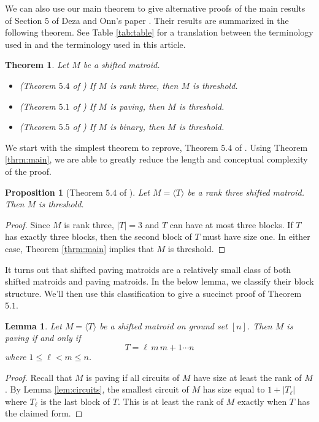 \documentclass{amsart}
\theoremstyle{definition}
\theoremstyle{plain}
\newtheorem{lemma}[defn]{Lemma}
\newtheorem{prop}[defn]{Proposition}
\newtheorem{thrm}[defn]{Theorem}
\begin{document}
We can also use our main theorem to give alternative proofs of the main results of Section $5$ of Deza and Onn's paper \cite{DO}. Their results are summarized in the following theorem. See Table \ref{tab:table} for a translation between the terminology used in \cite{DO} and the terminology used in this article. 

\begin{thrm}
\label{thrm:DO}
Let $M$ be a shifted matroid.
\begin{itemize}
\item (Theorem $5.4$ of \cite{DO}) If $M$ is rank three, then $M$ is threshold.
\item (Theorem $5.1$ of \cite{DO}) If $M$ is paving, then $M$ is threshold.
\item (Theorem $5.5$ of \cite{DO}) If $M$ is binary, then $M$ is threshold.
\end{itemize}
\end{thrm}


We start with the simplest theorem to reprove, Theorem $5.4$ of \cite{DO}. Using Theorem \ref{thrm:main}, we are able to greatly reduce the length and conceptual complexity of the proof.
\begin{prop}[Theorem $5.4$ of \cite{DO}]
Let $M=\langle T \rangle $ be a rank three shifted matroid. Then $M$ is threshold.
\end{prop}
\begin{proof}
Since $M$ is rank three, $|T|=3$ and $T$ can have at most three blocks. If $T$ has exactly three blocks, then the second block of $T$ must have size one. In either case, Theorem \ref{thrm:main} implies that $M$ is threshold.
\end{proof}

It turns out that shifted paving matroids are a relatively small class of both shifted matroids and paving matroids. In the below lemma, we classify their block structure. We'll then use this classification to give a succinct proof of Theorem $5.1$.

\begin{lemma}
\label{lem:paving}
Let $M= \langle T \rangle$ be a shifted matroid on ground set $[n]$. Then $M$ is paving if and only if
\[T =  \ell\, m\, m+1 \cdots n \]
where $1\leq \ell < m \leq n$.
\end{lemma}
\begin{proof}
Recall that $M$ is paving if all circuits of $M$ have size at least the rank of $M$. By Lemma \ref{lem:circuits}, the smallest circuit of $M$ has size equal to $1+|T_\ell|$ where $T_\ell$ is the last block of $T$. This is at least the rank of $M$ exactly when $T$ has the claimed form.
\end{proof}
\end{document}
